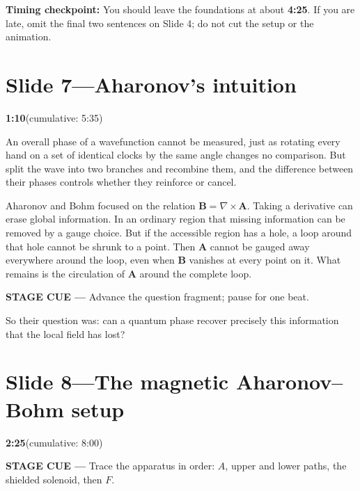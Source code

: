 \documentclass[a4paper,11pt]{article}
\newcommand{\slidetime}[2]{%
  {\small\sffamily\color{timegreen}\textbf{#1}\enspace(cumulative: #2)}%
}
\newcommand{\cue}[1]{%
  \par\smallskip
  \noindent
  {\small\sffamily\color{cueblue}\textbf{STAGE CUE ---} #1}
  \par\smallskip
}
\newcommand{\checkpoint}[1]{%
  \par\smallskip
  \noindent
  \colorbox{softgray}{%
    \parbox{0.965\linewidth}{%
      \small\sffamily\color{textgray}\textbf{Timing checkpoint:} #1}}
  \par\smallskip
}
\newenvironment{spoken}{%
  \begin{list}{}{%
    \setlength{\leftmargin}{1.1em}%
    \setlength{\rightmargin}{1.1em}%
    \setlength{\topsep}{2pt}%
    \setlength{\partopsep}{0pt}%
    \setlength{\parsep}{5pt}%
    \setlength{\itemsep}{0pt}}%
  \item\relax
}{\end{list}}
\newcommand{\slideheading}[4]{%
  \needspace{10\baselineskip}
  \section*{#1\enspace---\enspace#2}
  \vspace{-0.7em}
  \noindent\slidetime{#3}{#4}\par\smallskip
}
\begin{document}
\checkpoint{You should leave the foundations at about \textbf{4:25}. If you
are late, omit the final two sentences on Slide 4; do not cut the setup or the
animation.}


\slideheading{Slide 7}{Aharonov's intuition}{1:10}{5:35}

\begin{spoken}
An overall phase of a wavefunction cannot be measured, just as rotating every
hand on a set of identical clocks by the same angle changes no comparison.
But split the wave into two branches and recombine them, and the difference
between their phases controls whether they reinforce or cancel.

Aharonov and Bohm focused on the relation
\(\mathbf B=\nabla\times\mathbf A\). Taking a derivative can erase global
information. In an ordinary region that missing information can be removed by
a gauge choice. But if the accessible region has a hole, a loop around that
hole cannot be shrunk to a point. Then \(\mathbf A\) cannot be gauged away
everywhere around the loop, even when \(\mathbf B\) vanishes at every point on
it. What remains is the circulation of \(\mathbf A\) around the complete loop.
\end{spoken}

\cue{Advance the question fragment; pause for one beat.}

\begin{spoken}
So their question was: can a quantum phase recover precisely this information
that the local field has lost?
\end{spoken}


\slideheading{Slide 8}{The magnetic Aharonov--Bohm setup}{2:25}{8:00}

\cue{Trace the apparatus in order: \(A\), upper and lower paths, the shielded
solenoid, then \(F\).}
\end{document}
